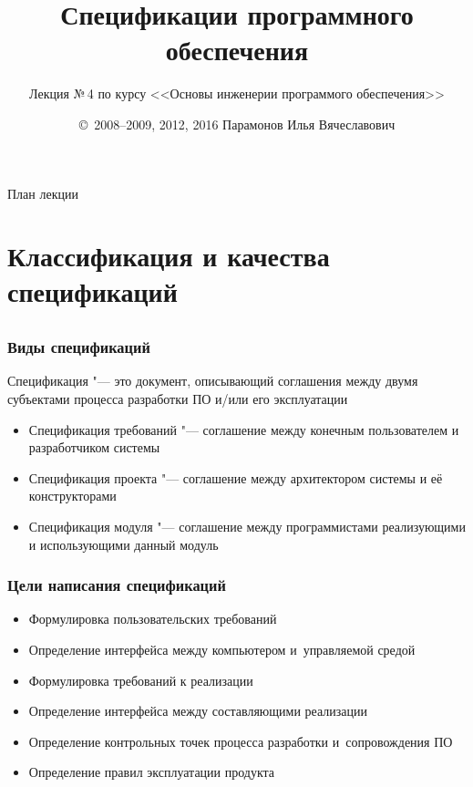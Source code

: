 \documentclass{softengineering-lectures}
\title{Спецификации программного обеспечения}
\author{Лекция №\,4 по курсу \newline <<Основы инженерии программого обеспечения>>}
\date{\small \copyright\ 2008--2009, 2012, 2016 Парамонов Илья Вячеславович}
\begin{document}
\begin{frame}
  \titlepage
\end{frame}

\begin{frame}{План лекции}
  \tableofcontents
\end{frame}

\section{Классификация и качества спецификаций}

\subsection{}

\begin{frame} \frametitle{Виды спецификаций}

  \begin{definition}
    \alert{Спецификация} "--- это документ, описывающий соглашения между двумя
    субъектами процесса разработки ПО и/или его эксплуатации
  \end{definition}
  
  \begin{itemize}
  \item Спецификация требований "--- соглашение между конечным
    пользователем и разработчиком системы
  \item Спецификация проекта "--- соглашение между архитектором системы и её
    конструкторами
  \item Спецификация модуля "--- соглашение между программистами реализующими и
    использующими данный модуль
  \end{itemize}
  
\end{frame}

\begin{frame} \frametitle{Цели написания спецификаций}

  \begin{itemize}
  \item Формулировка пользовательских требований
  \item Определение интерфейса между компьютером и~управляемой средой
  \item Формулировка требований к реализации
  \item Определение интерфейса между составляющими реализации
  \item Определение контрольных точек процесса разработки и~сопровождения ПО
  \item Определение правил эксплуатации продукта
  \end{itemize}
  
\end{frame}
\end{document}

